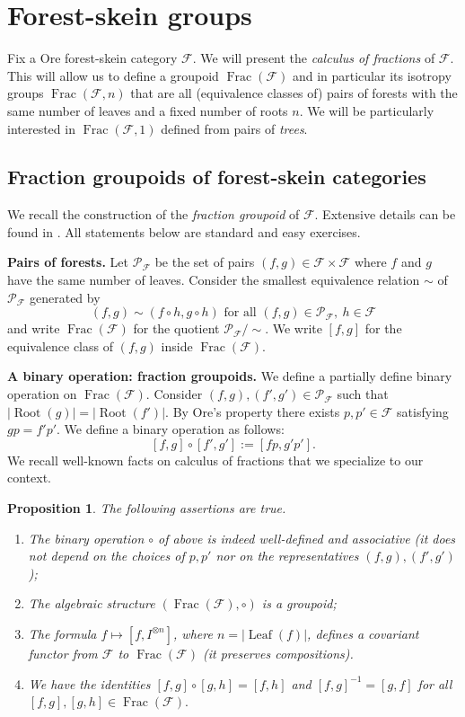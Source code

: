 \documentclass[a4paper, 12pt]{amsart}
\numberwithin{equation}{section}
\newtheorem{proposition}[theorem]{Proposition}
\theoremstyle{definition}
\newcommand{\cF}{\mathcal F}
\DeclareMathOperator{\Frac}{Frac}
\DeclareMathOperator{\Leaf}{Leaf}
\newcommand{\ot}{\otimes}
\newcommand{\cP}{\mathcal P}
\DeclareMathOperator{\Root}{Root}
\begin{document}
\section{Forest-skein groups}\label{sec:forest-groups}

Fix a Ore forest-skein category $\cF$.
We will present the \textit{calculus of fractions} of $\cF$. 
This will allow us to define a groupoid $\Frac(\cF)$ and in particular its isotropy groups $\Frac(\cF,n)$ that are all (equivalence classes of) pairs of forests with the same number of leaves and a fixed number of roots $n$. 
We will be particularly interested in $\Frac(\cF,1)$ defined from pairs of {\it trees}.

\subsection{Fraction groupoids of forest-skein categories}

We recall the construction of the \textit{fraction groupoid} of $\cF$. 
Extensive details can be found in \cite{Gabriel-Zisman67}. All statements below are standard and easy exercises.

{\bf Pairs of forests.}
Let $\cP_\cF$ be the set of pairs $(f,g)\in\cF\times \cF$ where $f$ and $g$ have the same number of leaves.
Consider the smallest equivalence relation $\sim$ of $\cP_\cF$ generated by 
$$(f,g)\sim (f\circ h, g\circ h) \text{ for all } (f,g)\in \cP_\cF , \ h\in\cF$$ and write $\Frac(\cF)$ for the quotient $\cP_\cF/\sim$.
We write $[f,g]$ for the equivalence class of $(f,g)$ inside $\Frac(\cF)$.

{\bf A binary operation: fraction groupoids.}
We define a partially define binary operation on $\Frac(\cF)$.
Consider $(f,g), (f',g')\in \cP_\cF$ such that $|\Root(g)|=|\Root(f')|$. 
By Ore's property there exists $p,p'\in\cF$ satisfying $gp=f'p'$.
We define a binary operation as follows:
$$[f,g]\circ [f',g']:= [fp, g'p'].$$
We recall well-known facts on calculus of fractions that we specialize to our context.

\begin{proposition}
The following assertions are true.
\begin{enumerate}
\item The binary operation $\circ$ of above is indeed well-defined and associative (it does not depend on the choices of $p,p'$ nor on the representatives $(f,g), (f',g')$);
\item The algebraic structure $(\Frac(\cF),\circ)$ is a groupoid;
\item The  formula $f\mapsto [f,I^{\ot n}]$, where $n=|\Leaf(f)|$, defines a covariant functor from $\cF$ to $\Frac(\cF)$ (it preserves compositions).
\item We have the identities $[f,g]\circ [g,h] = [f,h]$ and $[f,g]^{-1}=[g,f]$ for all $[f,g],[g,h]\in\Frac(\cF).$
\end{enumerate}
\end{proposition}
\end{document}
